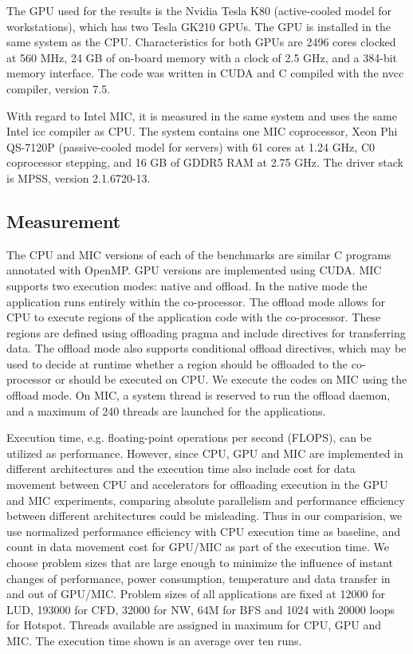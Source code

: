 
The GPU used for the results is the Nvidia Tesla K80 (active-cooled model for workstations), which has two Tesla GK210 GPUs. The GPU 
is installed in the same system as the CPU. 
Characteristics for both GPUs are 2496 cores clocked at 560 MHz, 24 GB of on-board memory with a clock of 2.5 GHz, and a 384-bit memory interface. The code was written in CUDA and C compiled with the nvcc compiler, version 7.5. 


With regard to Intel MIC, it is measured in the same system and uses the same Intel icc compiler as CPU. 
The system contains one MIC coprocessor, Xeon Phi QS-7120P (passive-cooled model for servers) with 61 cores at 1.24 GHz, C0 coprocessor stepping, and 16 GB of GDDR5 RAM at 2.75 GHz. The driver stack is MPSS, version 2.1.6720-13. 

\subsection{Measurement}

The CPU and MIC versions of each of the benchmarks are similar C programs annotated with OpenMP. 
GPU versions are implemented using CUDA. MIC supports two execution modes: native and offload. 
In the native mode the application runs entirely within the co-processor. The offload mode allows for CPU to 
execute regions of the application code with the co-processor. These regions are defined using offloading pragma 
and include directives for transferring data. The offload mode also supports conditional offload directives, 
which may be used to decide at runtime whether a region should be offloaded to the co-processor or 
should be executed on CPU. We execute the codes on MIC using the offload mode. On MIC, a system thread 
is reserved to run the offload daemon, and a maximum of 240 threads are launched for the applications.

Execution time, e.g. floating-point operations per second (FLOPS), can be utilized as performance. 
However, since CPU, GPU and MIC are implemented in 
different architectures and the execution time also include cost for data movement between CPU and accelerators 
for offloading execution in the GPU and MIC experiments, comparing absolute parallelism and performance efficiency between 
different architectures could be misleading. Thus in our comparision, we use normalized performance efficiency with CPU 
execution time as baseline, and count in data movement cost for GPU/MIC as part of the execution time. 
We choose problem sizes that are large enough to 
minimize the influence of instant changes of performance, power consumption, 
temperature and data transfer in and out of GPU/MIC. 
Problem sizes of all applications are fixed at 12000 for LUD, 193000 for CFD, 32000 for NW, 64M for BFS and 1024 with 20000 loops for Hotspot. Threads available are assigned in maximum for CPU, GPU and MIC. The execution time shown is an average over ten runs.

